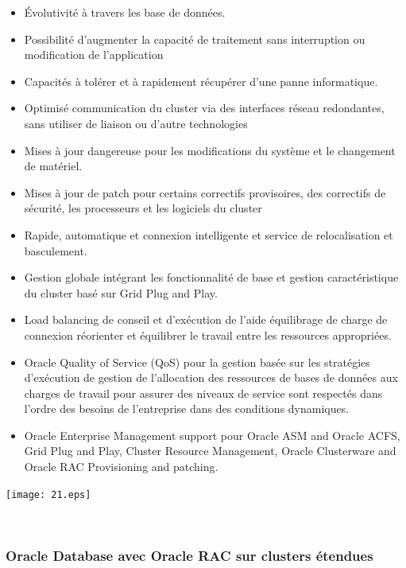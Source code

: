 \documentclass[12pt]{report}
\begin{document}
\begin{itemize}
\item Évolutivité à travers les base de données.
\item Possibilité d'augmenter la capacité de traitement sans interruption ou
modification de l'application
\item Capacités à tolérer et à rapidement récupérer d'une panne informatique.
\item Optimisé communication du cluster via des interfaces réseau redondantes,
  sans utiliser de liaison ou d'autre technologies
\item Mises à jour dangereuse pour les modifications du système et le changement
  de matériel.
\item Mises à jour de patch  pour certains correctifs provisoires, des
  correctifs de sécurité, les processeurs et les logiciels du cluster 
\item Rapide, automatique et connexion intelligente et service de relocalisation
  et basculement.
\item Gestion globale intégrant les fonctionnalité de base et gestion
  caractéristique du cluster basé sur Grid Plug and Play.
\item Load balancing de conseil et d'exécution de l'aide équilibrage de charge
  de connexion réorienter et équilibrer le travail entre les ressources
  appropriées. 
\item Oracle Quality of Service (QoS) pour la gestion basée sur les stratégies
  d'exécution de gestion de l'allocation des ressources de bases de données aux
  charges de travail pour assurer des niveaux de service sont respectés dans
  l'ordre des besoins de l'entreprise dans des conditions dynamiques. 
\item Oracle Enterprise Management support pour  Oracle ASM and Oracle ACFS, Grid Plug
and Play, Cluster Resource Management, Oracle Clusterware and Oracle RAC
Provisioning and patching.
\end{itemize}
\vspace{1cm}

\begin{center}
  \texttt{[image: 21.eps]}
\end{center}\\

\subsubsection{Oracle Database avec Oracle RAC sur clusters étendues}
\end{document}
